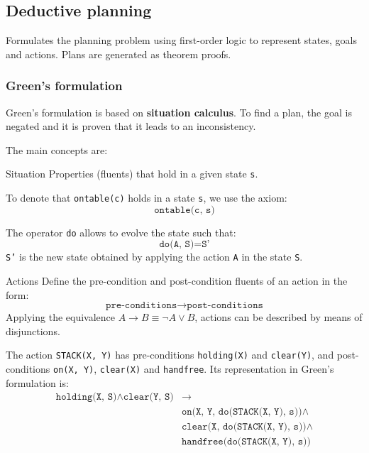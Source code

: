 \subsection{Deductive planning}
Formulates the planning problem using first-order logic to represent states, goals and actions.
Plans are generated as theorem proofs.

\subsubsection{Green's formulation}
Green's formulation is based on \textbf{situation calculus}.
To find a plan, the goal is negated and it is proven that it leads to an inconsistency.

The main concepts are:
\begin{descriptionlist}
    \item[Situation]
        Properties (fluents) that hold in a given state \texttt{s}.
        \begin{example}
            To denote that \texttt{ontable(c)} holds in a state \texttt{s}, we use the axiom:
            \[ \texttt{ontable(c, s)} \]
        \end{example}
        The operator \texttt{do} allows to evolve the state such that:
        \[ \texttt{do(A, S)} = \texttt{S'} \]
        \texttt{S'} is the new state obtained by applying the action \texttt{A} in the state \texttt{S}.

    \item[Actions]
        Define the pre-condition and post-condition fluents of an action in the form:
        \[ \texttt{pre-conditions} \rightarrow \texttt{post-conditions} \]
        Applying the equivalence $A \rightarrow B \equiv \lnot A \vee B$, actions can be described by means of disjunctions.
        \begin{example}
            The action \texttt{STACK(X, Y)} has pre-conditions \texttt{holding(X)} and \texttt{clear(Y)}, and
            post-conditions \texttt{on(X, Y)}, \texttt{clear(X)} and \texttt{handfree}.
            Its representation in Green's formulation is:
            \[
                \begin{split}
                    \texttt{holding(X, S)} \land \texttt{clear(Y, S)} &\rightarrow \\
                    &\texttt{on(X, Y, do(STACK(X, Y), s))} \land \\
                    &\texttt{clear(X, do(STACK(X, Y), s))} \land \\
                    &\texttt{handfree(do(STACK(X, Y), s))} \\
                \end{split}
            \]
        \end{example}


\end{descriptionlist}
